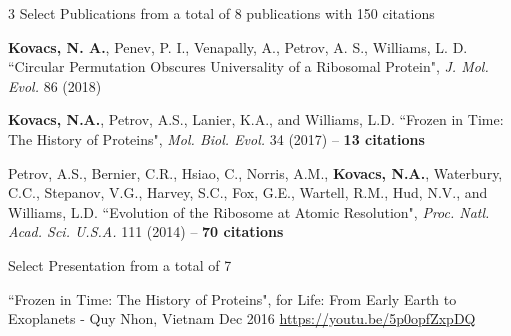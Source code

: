 

\begin{cventries}

  \cventry
  	{3 Select Publications from a total of 8 publications with 150 citations} %
    {} %
    {} %
    {} %
    {\begin{cvitems}
    \item {\bf Kovacs, N. A.}, Penev, P. I., Venapally, A., Petrov, A. S., Williams, L. D. ``Circular Permutation Obscures Universality of a Ribosomal Protein", \textit{J. Mol. Evol.} 86 (2018)
    \item {\bf Kovacs, N.A.}, Petrov, A.S., Lanier, K.A., and Williams, L.D. ``Frozen in Time: The History of Proteins", \textit{Mol. Biol. Evol.} 34 (2017) -- {\bf 13 citations}
    \item Petrov, A.S., Bernier, C.R., Hsiao, C., Norris, A.M., {\bf Kovacs, N.A.}, Waterbury, C.C., Stepanov, V.G., Harvey, S.C., Fox, G.E., Wartell, R.M., Hud, N.V., and Williams, L.D. ``Evolution of the Ribosome at Atomic Resolution", \textit{Proc. Natl. Acad. Sci. U.S.A.} 111 (2014) -- {\bf 70 citations}
    \end{cvitems}
    }
    
  \cventry
  	{Select Presentation from a total of 7} %
    {} %
    {} %
    {} %
    {\begin{cvitems}
    \item ``Frozen in Time: The History of Proteins", {\itSearch for Life: From Early Earth to Exoplanets - Quy Nhon, Vietnam} Dec 2016 \href{https://youtu.be/5p0opfZxpDQ}{https://youtu.be/5p0opfZxpDQ}
    \end{cvitems}
    }
    
\vspace{-1em}

\end{cventries}
